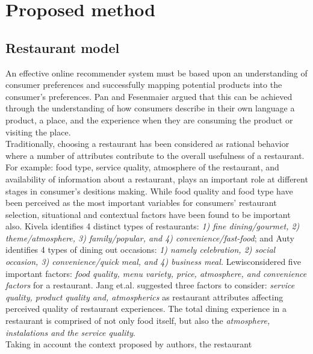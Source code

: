 
\section{Proposed method}\label{sec:3}
\subsection{Restaurant model} \label{sec:3.1}

An effective online recommender system must be based upon an
understanding of consumer  preferences and successfully mapping
potential products into the consumer’s
preferences\cite{adomavicius2011context}. Pan and
Fesenmaier\cite{pan2006online} argued that this can be achieved
through the understanding of how consumers describe in their own
language a product, a place, and the experience when they are
consuming the product or visiting the place.\\  Traditionally,
choosing a restaurant has been considered as rational behavior where a
number of attributes contribute to the overall usefulness of a
restaurant. For example: food type, service quality, atmosphere of the
restaurant, and availability of information about a restaurant, plays
an important role at different stages in consumer’s desitions
making\cite{auty1992consumer}. While food quality and food type have
been perceived as the most important variables for consumers’
restaurant selection, situational and contextual factors have been
found to be important also. Kivela\cite{jack1997restaurant} identifies
4 distinct types of restaurants: \textit{1) fine dining/gourmet, 2)
theme/atmosphere, 3) family/popular, and 4) convenience/fast-food};
and Auty\cite{auty1992consumer} identifies 4 types of dining out
occasions: \textit{1) namely celebration, 2) social occasion, 3)
convenience/quick meal, and 4) business meal.}
Lewis\cite{lewis1981restaurant}considered five important factors:
\textit{food quality, menu variety, price, atmosphere, and convenience
factors} for a restaurant. Jang et.al.\cite{jang2009perceived}
suggested three factors to consider: \textit{service quality, product
quality and, atmospherics} as restaurant attributes affecting
perceived quality of restaurant experiences. The total dining
experience in a restaurant is comprised of not only food itself, but
also the  \textit{atmosphere, instalations and the service quality}.\\
Taking in account the context proposed by authors, the restaurant
